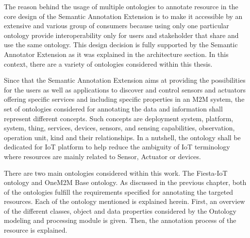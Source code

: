 The reason behind the usage of multiple ontologies to annotate resource in the core design of the Semantic Annotation Extension is to make it accessible by an extensive and various group of consumers because using only one particular ontology provide interoperability only for users and stakeholder that share and use the same ontology. This design decision is fully supported by the Semantic Annotator Extension as it was explained in the architecture section. In this context, there are a variety of ontologies considered within this thesis.\par
Since that the Semantic Annotation Extension aims at providing the possibilities for the users as well as applications to discover and control sensors and actuators offering specific services and including specific properties in an M2M system, the set of ontologies considered for annotating the data and information shall represent different concepts. Such concepts are deployment system, platform, system, thing, services, devices, sensors, and sensing capabilities, observation, operation unit, kind and their relationships. In a nutshell, the ontology shall be dedicated for IoT platform to help reduce the ambiguity of IoT terminology where resources are mainly related to Sensor, Actuator or devices.\PAR

There are two main ontologies considered within this work. The Fiesta-IoT ontology and OneM2M Base ontology. As discussed in the previous chapter, both of the ontologies fulfill the requirements specified for annotating the targeted resources. Each of the ontology mentioned is explained herein. First, an overview of the different classes, object and data properties considered by the Ontology modeling and processing module is given. Then, the annotation process of the resource is explained.\PAR
